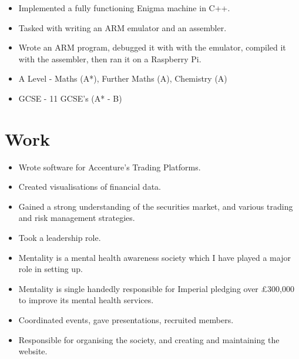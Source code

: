 \documentclass{jcgcv}
\begin{document}
\begin{column}
\begin{adjustwidth}{0.3cm}{}
\begin{itemize}
  \item Implemented a fully functioning Enigma machine in C++.
\end{itemize}

\begin{itemize}
  \item Tasked with writing an ARM emulator and an assembler.
  \item Wrote an ARM program, debugged it with with the emulator, compiled it with the assembler, then ran it on a Raspberry Pi.
\end{itemize}

\end{adjustwidth}
\vspace{10pt}

\begin{itemize}
  \item A Level - Maths (A*), Further Maths (A), Chemistry (A)
  \item GCSE - 11 GCSE's (A* - B)
\end{itemize}



\section{Work}

\begin{itemize}
  \item Wrote software for Accenture's Trading Platforms.
  \item Created visualisations of financial data.
  \item Gained a strong understanding of the securities market, and various trading and risk management strategies.
  \item Took a leadership role.
\end{itemize}

\begin{itemize}
  \item Mentality is a mental health awareness society which I have played a major role in setting up.
  \item Mentality is single handedly responsible for Imperial pledging over \pounds300,000 to improve its mental health services.
  \item Coordinated events, gave presentations, recruited members.
  \item Responsible for organising the society, and creating and maintaining the website.
\end{itemize}


\end{column}
\end{document}
